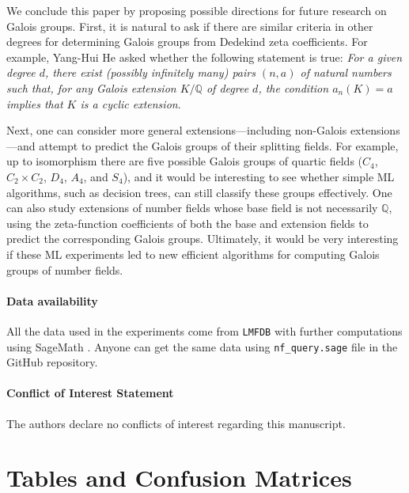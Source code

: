 \documentclass[letterpaper, 10pt]{article}
\newcommand{\bQ}{\mathbb{Q}}
\newcommand{\1}{\mathds{1}}	%
\theoremstyle{definition}
\theoremstyle{remark}
\begin{document}
We conclude this paper by proposing possible directions for future research on Galois groups.
First, it is natural to ask if there are similar criteria in other degrees for determining Galois groups from Dedekind zeta coefficients.
For example, Yang-Hui He asked whether the following statement is true:
\emph{For a given degree \(d\), there exist (possibly infinitely many) pairs \((n, a)\) of natural numbers such that, for any Galois extension \(K / \bQ\) of degree \(d\), the condition \(a_n(K) = a\) implies that \(K\) is a cyclic extension}.

Next, one can consider more general extensions---including non-Galois extensions---and attempt to predict the Galois groups of their splitting fields. 
For example, up to isomorphism there are five possible Galois groups of quartic fields (\(C_4\), \(C_2\times C_2\), \(D_4\), \(A_4\), and \(S_4\)), and it would be interesting to see whether simple ML algorithms, such as decision trees, can still classify these groups effectively.
One can also study extensions of number fields whose base field is not necessarily \(\mathbb{Q}\), using the zeta-function coefficients of both the base and extension fields to predict the corresponding Galois groups.  Ultimately, it would be very interesting if these ML experiments led to new efficient algorithms for computing Galois groups of number fields.

\paragraph{Data availability}

All the data used in the experiments come from \texttt{LMFDB} \cite{lmfdb} with further computations using SageMath \cite{sagemath}. Anyone can get the same data using \texttt{nf\_query.sage} file in the GitHub repository.

\paragraph{Conflict of Interest Statement}

The authors declare no conflicts of interest regarding this manuscript.



\appendix


\section{Tables and Confusion Matrices}
\end{document}
